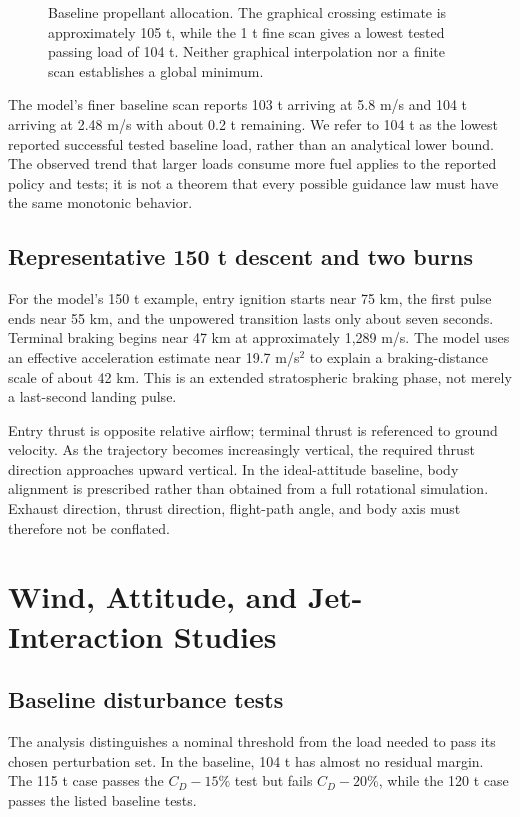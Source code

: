 \documentclass[11pt,a4paper]{article}
\begin{document}
\begin{figure}[htbp]
\centering\SourceFuelPlot
\caption{Baseline propellant allocation. The graphical crossing estimate is approximately 105 t, while the 1 t fine scan gives a lowest tested passing load of 104 t. Neither graphical interpolation nor a finite scan establishes a global minimum.}
\label{fig:fuel}
\end{figure}

The model's finer baseline scan reports 103 t arriving at 5.8 m/s and 104 t arriving at 2.48 m/s with about 0.2 t remaining. We refer to 104 t as the lowest reported successful tested baseline load, rather than an analytical lower bound. The observed trend that larger loads consume more fuel applies to the reported policy and tests; it is not a theorem that every possible guidance law must have the same monotonic behavior.

\subsection{Representative 150 t descent and two burns}


For the model's 150 t example, entry ignition starts near 75 km, the first pulse ends near 55 km, and the unpowered transition lasts only about seven seconds. Terminal braking begins near 47 km at approximately 1,289 m/s. The model uses an effective acceleration estimate near 19.7 m/s$^2$ to explain a braking-distance scale of about 42 km. This is an extended stratospheric braking phase, not merely a last-second landing pulse.




Entry thrust is opposite relative airflow; terminal thrust is referenced to ground velocity. As the trajectory becomes increasingly vertical, the required thrust direction approaches upward vertical. In the ideal-attitude baseline, body alignment is prescribed rather than obtained from a full rotational simulation. Exhaust direction, thrust direction, flight-path angle, and body axis must therefore not be conflated.

\section{Wind, Attitude, and Jet-Interaction Studies}
\subsection{Baseline disturbance tests}
The analysis distinguishes a nominal threshold from the load needed to pass its chosen perturbation set. In the baseline, 104 t has almost no residual margin. The 115 t case passes the $C_D-15\%$ test but fails $C_D-20\%$, while the 120 t case passes the listed baseline tests.
\end{document}
